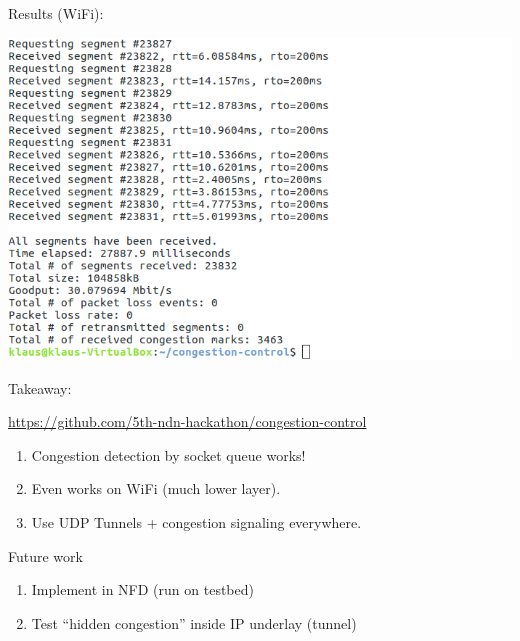 \begin{frame}{Results (WiFi):}

\includegraphics[width=\linewidth]{../results/screenshots.png}

\end{frame}




\begin{frame}{Takeaway:}

{\footnotesize
\url{https://github.com/5th-ndn-hackathon/congestion-control}
}
\begin{enumerate}
\item Congestion detection by socket queue works! 
\item Even works on WiFi (much lower layer).
\item Use UDP Tunnels + congestion signaling everywhere.
\end{enumerate}

\pause
Future work
\begin{enumerate}
\item Implement in NFD (run on testbed)
\item Test ``hidden congestion'' inside IP underlay (tunnel)
\end{enumerate}


\end{frame}




